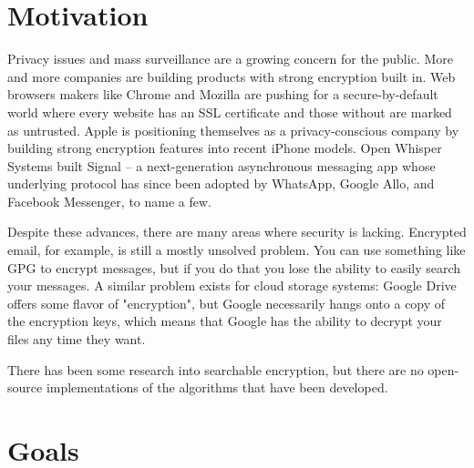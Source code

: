\documentclass[onecolumn, draftclsnofoot,10pt, compsoc]{IEEEtran}
\begin{document}


\section{Motivation}

Privacy issues and mass surveillance are a growing concern for the public.
More and more companies are building products with strong encryption built in.
Web browsers makers like Chrome and Mozilla are pushing for a secure-by-default world where every website has an SSL certificate and those without are marked as untrusted.
Apple is positioning themselves as a privacy-conscious company by building strong encryption features into recent iPhone models.
Open Whisper Systems built Signal -- a next-generation asynchronous messaging app whose underlying protocol has since been adopted by WhatsApp, Google Allo, and Facebook Messenger, to name a few.

Despite these advances, there are many areas where security is lacking.
Encrypted email, for example, is still a mostly unsolved problem.
You can use something like GPG to encrypt messages, but if you do that you lose
the ability to easily search your messages.
A similar problem exists for cloud storage systems:
Google Drive offers some flavor of "encryption", but Google necessarily hangs onto a copy of the encryption keys, which means that Google has the ability to decrypt your files any time they want.


There has been some research into searchable encryption, but there are no open-source implementations of the algorithms that have been developed.




\section{Goals}
\end{document}
